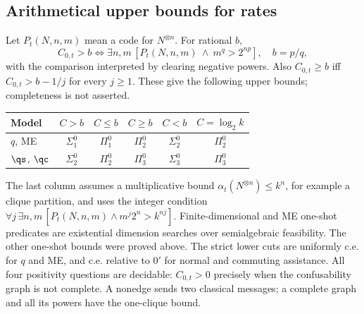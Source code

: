 \subsection{Arithmetical upper bounds for rates}
Let $P_t(N,n,m)$ mean a code for $N^{\otimes n}$. For rational $b$,
\[
 C_{0,t}>b\iff\exists n,m\,[P_t(N,n,m)\ \land\ m^{q}>2^{np}],
 \quad b=p/q,
\]
with the comparison interpreted by clearing negative powers. Also
$C_{0,t}\ge b$ iff $C_{0,t}>b-1/j$ for every $j\ge1$.
These give the following upper bounds; completeness is not asserted.
\begin{center}\small
\begin{tabular}{@{}lccccc@{}}\toprule
Model & $C>b$ & $C\le b$ & $C\ge b$ & $C<b$ & $C=\log_2k$\\\midrule
$q$, ME & $\Sigma^0_1$&$\Pi^0_1$&$\Pi^0_2$&$\Sigma^0_2$&$\Pi^0_2$\\
$\qs$, $\qc$ & $\Sigma^0_2$&$\Pi^0_2$&$\Pi^0_3$&$\Sigma^0_3$&$\Pi^0_3$\\\bottomrule
\end{tabular}
\end{center}
The last column assumes a multiplicative bound $\alpha_t(N^{\otimes n})\le k^n$,
for example a clique partition, and uses the integer condition
$\forall j\,\exists n,m\,[P_t(N,n,m)\land m^j2^n>k^{nj}]$.
Finite-dimensional and ME one-shot predicates are existential dimension
searches over semialgebraic feasibility. The other one-shot bounds were
proved above. The strict lower cuts are uniformly c.e. for $q$ and ME,
and c.e. relative to $0'$ for normal and commuting assistance. All four positivity questions are decidable:
$C_{0,t}>0$ precisely when the confusability graph is not complete.
A nonedge sends two classical messages; a complete graph and all its
powers have the one-clique bound.

